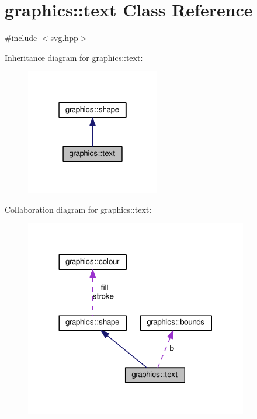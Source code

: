 \hypertarget{classgraphics_1_1text}{}\section{graphics\+:\+:text Class Reference}
\label{classgraphics_1_1text}


{\ttfamily \#include $<$svg.\+hpp$>$}



Inheritance diagram for graphics\+:\+:text\+:
\nopagebreak
\begin{figure}[H]
\begin{center}
\leavevmode
\includegraphics[width=166pt]{classgraphics_1_1text__inherit__graph}
\end{center}
\end{figure}


Collaboration diagram for graphics\+:\+:text\+:
\nopagebreak
\begin{figure}[H]
\begin{center}
\leavevmode
\includegraphics[width=276pt]{classgraphics_1_1text__coll__graph}
\end{center}
\end{figure}
